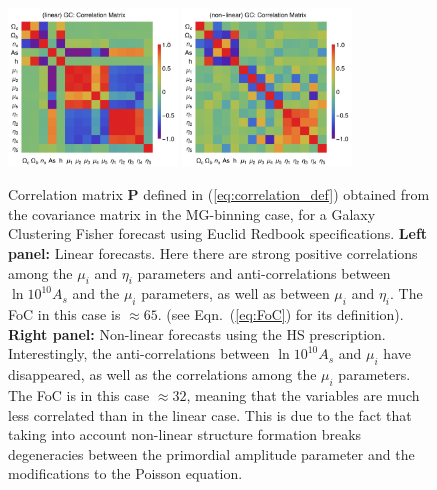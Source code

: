 \begin{figure}[H]
\centering
\includegraphics[width=0.4\textwidth]{Chapters/linear-nonlinear-MG-forecasts/figures/Decorrelations-GC/correlation-full-fiducialMGBin3-Euclid-GC-linearPK-}
\includegraphics[width=0.4\textwidth]{Chapters/linear-nonlinear-MG-forecasts/figures/Decorrelations-GC/correlation-full-fiducialMGBin3-Euclid-GC-nonlinearPk__Zhao-}
\caption[Correlation matrices for a Euclid Galaxy Clustering forecast.]{\label{fig:GCcorr}
Correlation matrix $\mathbf P$ defined in (\ref{eq:correlation_def}) obtained from the covariance matrix in the MG-binning case, for a Galaxy Clustering Fisher forecast using Euclid
Redbook specifications. \textbf{Left panel:}
Linear forecasts. Here there are strong positive correlations among the $\mu_i$ and $\eta_i$ parameters and anti-correlations between
 $\ln10^{10}A_{s}$  and the $\mu_i$ parameters, as well as between $\mu_i$ and $\eta_i$. The FoC in this case is $\approx 65$. (see Eqn.\ (\ref{eq:FoC}) for its definition).
\textbf{Right panel: } Non-linear 
forecasts using the HS prescription. Interestingly, the anti-correlations between  $\ln10^{10}A_{s}$  and $\mu_i$ 
have disappeared, as well as the correlations among the  $\mu_i$ parameters. The FoC is in this case   $\approx 32$, meaning that the variables are much less correlated than in the linear case.
This is due to the fact that taking into account non-linear structure formation breaks degeneracies between the primordial amplitude parameter and the modifications
to the Poisson equation.}
\end{figure}


